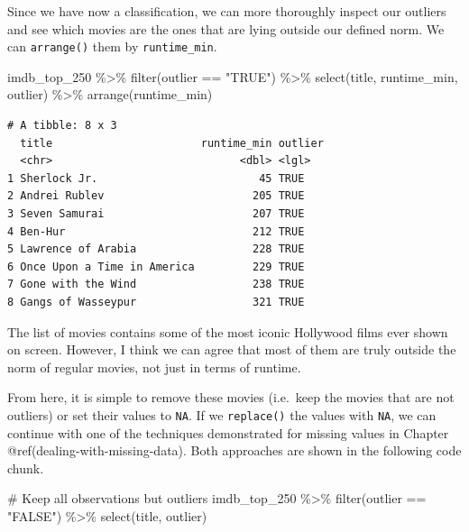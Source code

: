 \documentclass[
  letterpaper,
]{krantz}
\makeatletter
\newenvironment{Shaded}{\begin{snugshade}}{\end{snugshade}}
\newcommand{\CommentTok}[1]{\textcolor[rgb]{0.37,0.37,0.37}{#1}}
\newcommand{\FunctionTok}[1]{\textcolor[rgb]{0.28,0.35,0.67}{#1}}
\newcommand{\NormalTok}[1]{\textcolor[rgb]{0.00,0.23,0.31}{#1}}
\newcommand{\SpecialCharTok}[1]{\textcolor[rgb]{0.37,0.37,0.37}{#1}}
\newcommand{\StringTok}[1]{\textcolor[rgb]{0.13,0.47,0.30}{#1}}
\newenvironment{kframe}{%
\medskip{}
\setlength{\fboxsep}{.8em}
 \def\at@end@of@kframe{}%
 \ifinner\ifhmode%
  \def\at@end@of@kframe{\end{minipage}}%
  \begin{minipage}{\columnwidth}%
 \fi\fi%
 \def\FrameCommand##1{\hskip\@totalleftmargin \hskip-\fboxsep
 \colorbox{shadecolor}{##1}\hskip-\fboxsep
     \hskip-\linewidth \hskip-\@totalleftmargin \hskip\columnwidth}%
 \MakeFramed {\advance\hsize-\width
   \@totalleftmargin\z@ \linewidth\hsize
   \@setminipage}}%
 {\par\unskip\endMakeFramed%
 \at@end@of@kframe}
\renewenvironment{Shaded}{\begin{kframe}}{\end{kframe}}
\makeatother
\begin{document}
Since we have now a classification, we can more thoroughly inspect our
outliers and see which movies are the ones that are lying outside our
defined norm. We can \texttt{arrange()} them by \texttt{runtime\_min}.

\begin{Shaded}
\begin{Highlighting}[]
\NormalTok{imdb\_top\_250 }\SpecialCharTok{\%\textgreater{}\%}
  \FunctionTok{filter}\NormalTok{(outlier }\SpecialCharTok{==} \StringTok{"TRUE"}\NormalTok{) }\SpecialCharTok{\%\textgreater{}\%}
  \FunctionTok{select}\NormalTok{(title, runtime\_min, outlier) }\SpecialCharTok{\%\textgreater{}\%}
  \FunctionTok{arrange}\NormalTok{(runtime\_min)}
\end{Highlighting}
\end{Shaded}

\begin{verbatim}
# A tibble: 8 x 3
  title                       runtime_min outlier
  <chr>                             <dbl> <lgl>  
1 Sherlock Jr.                         45 TRUE   
2 Andrei Rublev                       205 TRUE   
3 Seven Samurai                       207 TRUE   
4 Ben-Hur                             212 TRUE   
5 Lawrence of Arabia                  228 TRUE   
6 Once Upon a Time in America         229 TRUE   
7 Gone with the Wind                  238 TRUE   
8 Gangs of Wasseypur                  321 TRUE   
\end{verbatim}

The list of movies contains some of the most iconic Hollywood films ever
shown on screen. However, I think we can agree that most of them are
truly outside the norm of regular movies, not just in terms of runtime.

From here, it is simple to remove these movies (i.e.~keep the movies
that are not outliers) or set their values to \texttt{NA}. If we
\texttt{replace()} the values with \texttt{NA}, we can continue with one
of the techniques demonstrated for missing values in Chapter
@ref(dealing-with-missing-data). Both approaches are shown in the
following code chunk.

\begin{Shaded}
\begin{Highlighting}[]
\CommentTok{\# Keep all observations but outliers}
\NormalTok{imdb\_top\_250 }\SpecialCharTok{\%\textgreater{}\%}
  \FunctionTok{filter}\NormalTok{(outlier }\SpecialCharTok{==} \StringTok{"FALSE"}\NormalTok{) }\SpecialCharTok{\%\textgreater{}\%}
  \FunctionTok{select}\NormalTok{(title, outlier)}
\end{Highlighting}
\end{Shaded}
\end{document}
